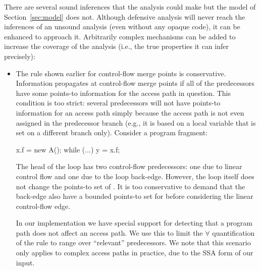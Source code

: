 There are several sound inferences that the analysis could make but
the model of Section~\ref{sec:model} does not.
Although defensive analysis will never reach the inferences of an
unsound analysis (even without any opaque code), it can be enhanced to
approach it. Arbitrarily complex mechanisms can be added to
increase the coverage of the analysis (i.e., the true properties it
can infer precisely):

\begin{itemize}
\item 
The rule shown earlier for control-flow
merge points is conservative. Information propagates at control-flow
merge points if all of the predecessors have some points-to
information for the access path in question. This condition is too
strict: several predecessors will not have points-to information for
an access path simply because the access path is not even assigned in
the predecessor branch (e.g., it is based on a local variable that is
set on a different branch only). Consider a program fragment:

\vspace{-4mm}\begin{minipage}[l]{5.1in}
\begin{javacode}
x.f = new A();
while (...) {
  y = x.f;
}
\end{javacode}
\end{minipage}

The head of the loop has two control-flow predecessors: one due to
linear control flow and one due to the loop back-edge. However, the
loop itself does not change the points-to set of . It is too
conservative to demand that the back-edge also have a bounded points-to
set for  before considering the linear control-flow edge.

In our implementation we have special support for detecting that a
program path does not affect an access path. We use this to limit the
$\forall$ quantification of the rule to range over ``relevant''
predecessors. We note that this scenario only applies to complex
access paths in practice, due to the SSA form of our input.



\end{itemize}

